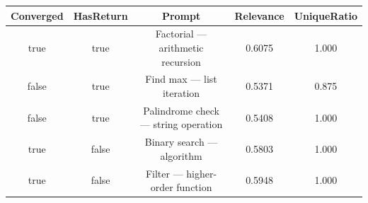 \begin{table}[h]
\centering
\begin{tabular}{ |c|c|c|c|c| }
\hline
Converged & HasReturn & Prompt & Relevance & UniqueRatio \\
\hline
true & true & Factorial — arithmetic recursion & 0.6075 & 1.000 \\
\hline
false & true & Find max — list iteration & 0.5371 & 0.875 \\
\hline
false & true & Palindrome check — string operation & 0.5408 & 1.000 \\
\hline
true & false & Binary search — algorithm & 0.5803 & 1.000 \\
\hline
true & false & Filter — higher-order function & 0.5948 & 1.000 \\
\hline
\end{tabular}
\end{table}
